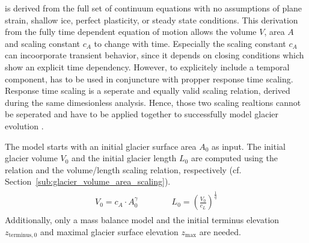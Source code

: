         \Vas{} is derived from the full set of continuum equations with no assumptions of plane strain, shallow ice, perfect plasticity, or steady state conditions. This derivation from the fully time dependent equation of motion allows the volume $V$, area $A$ and scaling constant $c_A$ to change with time. Especially the scaling constant $c_A$ can incoorporate transient behavior, since it depends on closing conditions which show an explicit time dependency. However, to explicitely include a temporal component, \vas{} has to be used in conjuncture with propper response time scaling. Response time scaling is a seperate and equally valid scaling relation, derived during the same dimesionless analysis. Hence, those two scaling realtions cannot be seperated and have to be applied together to successfully model glacier evolution \citep{Bahr2015}.

        The \vas{} model starts with an initial glacier surface area $A_0$ as input. The initial glacier volume $V_0$ and the initial glacier length $L_0$ are computed using the \vas{} relation and the volume/length scaling relation, respectively (cf. Section~\ref{sub:glacier_volume_area_scaling}).
        \begin{align}
            \begin{split}
                V_0 = c_A\cdot A_0^\gamma \qquad\qquad L_0 = \left(\frac{V_0}{c_L}\right)^\frac{1}{q}
            \end{split}
        \end{align}
        Additionally, only a mass balance model and the initial terminus elevation $z_{\text{terminus},0}$ and maximal glacier surface elevation $z_\text{max}$ are needed.

